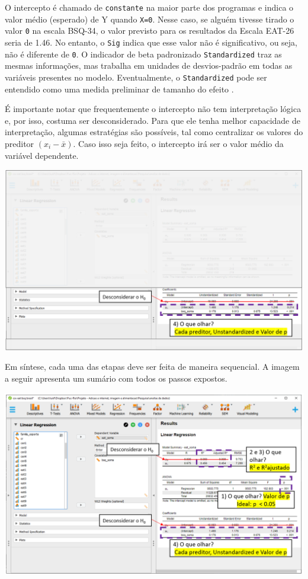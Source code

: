 \documentclass[
]{book}
\begin{document}
O intercepto é chamado de \texttt{constante} na maior parte dos programas e indica o valor médio (esperado) de Y quando \texttt{X=0}. Nesse caso, se alguém tivesse tirado o valor \texttt{0} na escala BSQ-34, o valor previsto para os resultados da Escala EAT-26 seria de 1.46. No entanto, o \texttt{Sig} indica que esse valor não é significativo, ou seja, não é diferente de \texttt{0}. O indicador de beta padronizado \texttt{Standardized} traz as mesmas informações, mas trabalha em unidades de desvios-padrão em todas as variáveis presentes no modelo. Eventualmente, o \texttt{Standardized} pode ser entendido como uma medida preliminar de tamanho do efeito \citep{fox2016}.

É importante notar que frequentemente o intercepto não tem interpretação lógica e, por isso, costuma ser desconsiderado. Para que ele tenha melhor capacidade de interpretação, algumas estratégias são possíveis, tal como centralizar os valores do preditor \((x_i-\bar{x})\). Caso isso seja feito, o intercepto irá ser o valor médio da variável dependente.

\includegraphics{./img/cap_reg_resultados4.png}

Em síntese, cada uma das etapas deve ser feita de maneira sequencial. A imagem a seguir apresenta um sumário com todos os passos expostos.

\includegraphics{./img/cap_reg_resultados_juntos.png}
\end{document}
